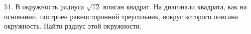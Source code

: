 51. В окружность радиуса $\sqrt{12}$ вписан квадрат. На диагонали квадрата, как на основании, построен равносторонний треугольник, вокруг которого описана окружность. Найти радиус этой окружности.\\
